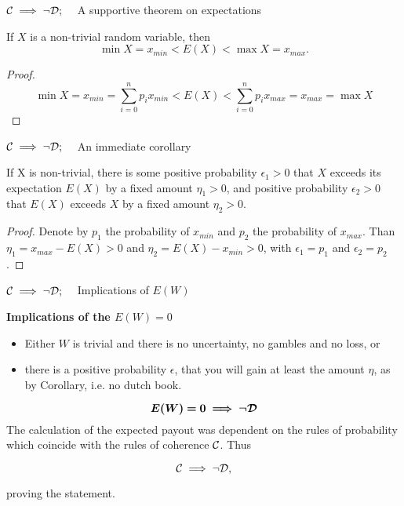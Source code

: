 \begin{frame}{$\mathcal{C}\implies\neg\mathcal{D};\quad$ A supportive theorem on expectations}

\begin{theorem}
If $X$ is a non-trivial random variable, then
$$\min{X}=x_{min}<E(X)<\max{X}=x_{max}.$$
\end{theorem}
\begin{proof}
$$\min{X}=x_{min}=\sum_{i=0}^np_ix_{min}<E(X)<\sum_{i=0}^np_ix_{max}=x_{max}=\max{X}$$
\end{proof}
\end{frame}

\begin{frame}{$\mathcal{C}\implies\neg\mathcal{D};\quad$ An immediate corollary}

\begin{corollary}[]
If X is non-trivial, there is some positive probability $\epsilon_1 > 0$ that $X$
exceeds its expectation $E(X)$ by a fixed amount $\eta_1 > 0$, and positive probability $\epsilon_2 > 0$ that
$E(X)$ exceeds $X$ by a fixed amount $\eta_2 > 0$.
\end{corollary}
\begin{proof}
Denote by $p_1$ the probability of $x_{min}$ and $p_2$ the probability of $x_{max}$. Than $\eta_1=x_{max}-E(X)>0$ and $\eta_2=E(X)-x_{min}>0$, with $\epsilon_1=p_1$ and $\epsilon_2=p_2$.
\end{proof}
\end{frame}

\begin{frame}{$\mathcal{C}\implies\neg\mathcal{D};\quad$ Implications of $E(W)$}
\begin{minipage}{\linewidth}
\begin{minipage}[]{0.45\linewidth}
{\textbf{Implications of the $E(W)=0$}}
\begin{itemize}\itemsep0.5em
\item Either $W$ is trivial and there is no uncertainty, no gambles and no loss, or
\item there is a positive probability $\epsilon$, that you will gain at least the amount $\eta$, as by Corollary, i.e. no dutch book.
\end{itemize}
\end{minipage}
\hfill
\begin{minipage}[]{0.45\linewidth}
$$\bm{E(W)=0\implies \neg\mathcal{D}}$$
The calculation of the expected payout was dependent on the rules of probability which coincide with the rules of coherence $\mathcal{C}$. Thus

$$\mathcal{C}\implies\neg\mathcal{D},$$

proving the statement.
\end{minipage}
\end{minipage}
\end{frame}

